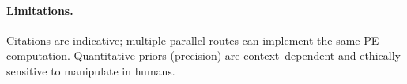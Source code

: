\documentclass[11pt]{article}
\begin{document}
\paragraph{Limitations.} Citations are indicative; multiple parallel routes can implement the same PE computation. Quantitative priors (precision) are context--dependent and ethically sensitive to manipulate in humans.



\end{document}
